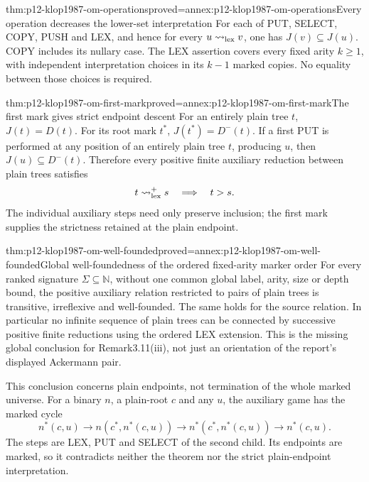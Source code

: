 \begin{hblemma}{thm:p12-klop1987-om-operations}{proved=annex:p12-klop1987-om-operations}{Every operation decreases the lower-set interpretation}
For each of PUT, SELECT, COPY, PUSH and LEX, and hence for every
\(u\rightsquigarrow_{\rm lex}v\), one has \(J(v)\subseteq J(u)\).
COPY includes its nullary case. The LEX assertion covers every fixed
arity \(k\geq1\), with independent interpretation choices in its
\(k-1\) marked copies. No equality between those choices is required.
\end{hblemma}

\begin{hblemma}{thm:p12-klop1987-om-first-mark}{proved=annex:p12-klop1987-om-first-mark}{The first mark gives strict endpoint descent}
For an entirely plain tree \(t\), \(J(t)=D(t)\). For its root
mark \(t^*\), \(J(t^*)=D^-(t)\). If a first PUT is performed
at any position of an entirely plain tree \(t\), producing \(u\),
then \(J(u)\subseteq D^-(t)\). Therefore every positive finite
auxiliary reduction between plain trees satisfies
\[
 t\rightsquigarrow_{\rm lex}^{+}s\quad\Longrightarrow\quad t>s.
\]
The individual auxiliary steps need only preserve inclusion; the
first mark supplies the strictness retained at the plain endpoint.
\end{hblemma}

\begin{hbtheorem}{thm:p12-klop1987-om-well-founded}{proved=annex:p12-klop1987-om-well-founded}{Global well-foundedness of the ordered fixed-arity marker order}
For every ranked signature \(\Sigma\subseteq\mathbb N\), without
one common global label, arity, size or depth bound, the positive
auxiliary relation restricted to pairs of plain trees is transitive,
irreflexive and well-founded. The same holds for the source relation.
In particular no infinite sequence of plain trees can be connected by
successive positive finite reductions using the ordered LEX extension.
This is the missing global conclusion for Remark3.11(iii), not just
an orientation of the report's displayed Ackermann pair.
\end{hbtheorem}

This conclusion concerns plain endpoints, not termination of the whole
marked universe. For a binary \(n\), a plain-root \(c\) and any
\(u\), the auxiliary game has the marked cycle
\[
 n^*(c,u)\longrightarrow n(c^*,n^*(c,u))
 \longrightarrow n^*(c^*,n^*(c,u))\longrightarrow n^*(c,u).
\]
The steps are LEX, PUT and SELECT of the second child. Its endpoints
are marked, so it contradicts neither the theorem nor the strict
plain-endpoint interpretation.

